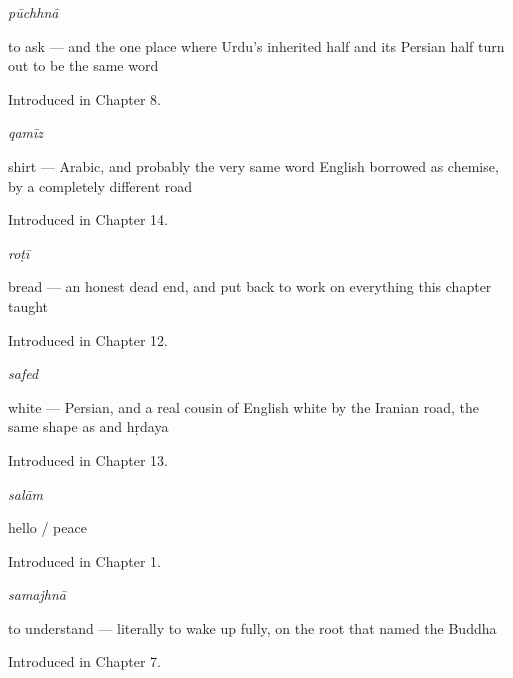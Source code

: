 \noindent\begin{minipage}[t]{\linewidth}
\raggedright
\textbf{}\enspace\emph{pūchhnā}\par
\small to ask — and the one place where Urdu's inherited half and its Persian half turn out to be the same word\par
\footnotesize Introduced in Chapter 8.
\end{minipage}\par\medskip

\noindent\begin{minipage}[t]{\linewidth}
\raggedright
\textbf{}\enspace\emph{qamīz}\par
\small shirt — Arabic, and probably the very same word English borrowed as chemise, by a completely different road\par
\footnotesize Introduced in Chapter 14.
\end{minipage}\par\medskip

\noindent\begin{minipage}[t]{\linewidth}
\raggedright
\textbf{}\enspace\emph{roṭī}\par
\small bread — an honest dead end, and  put back to work on everything this chapter taught\par
\footnotesize Introduced in Chapter 12.
\end{minipage}\par\medskip

\noindent\begin{minipage}[t]{\linewidth}
\raggedright
\textbf{}\enspace\emph{safed}\par
\small white — Persian, and a real cousin of English white by the Iranian road, the same shape as  and hṛdaya\par
\footnotesize Introduced in Chapter 13.
\end{minipage}\par\medskip

\noindent\begin{minipage}[t]{\linewidth}
\raggedright
\textbf{}\enspace\emph{salām}\par
\small hello / peace\par
\footnotesize Introduced in Chapter 1.
\end{minipage}\par\medskip

\noindent\begin{minipage}[t]{\linewidth}
\raggedright
\textbf{}\enspace\emph{samajhnā}\par
\small to understand — literally to wake up fully, on the root that named the Buddha\par
\footnotesize Introduced in Chapter 7.
\end{minipage}\par\medskip

